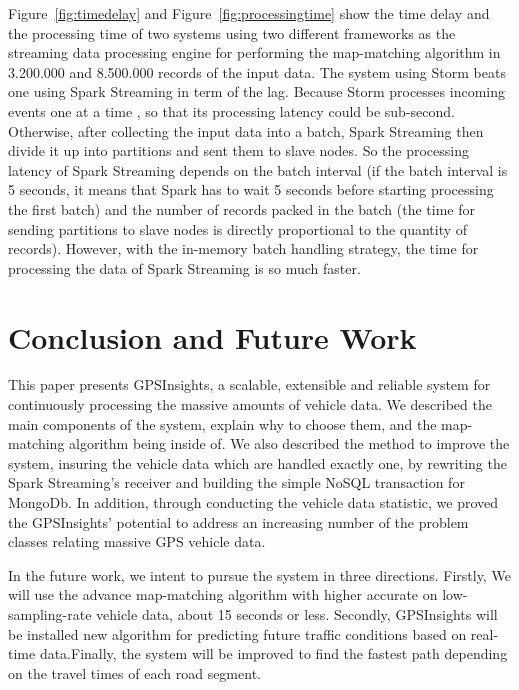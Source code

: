 \documentclass{acm_proc_article-sp}
\begin{document}
Figure~\ref{fig:timedelay} and Figure~\ref{fig:processingtime} show the time delay and the processing time of two systems using two different frameworks as the streaming data processing engine for performing the map-matching algorithm in 3.200.000 and 8.500.000 records of the input data. The system using Storm beats one using Spark Streaming in term of the lag. Because Storm processes incoming events one at a time , so that its processing latency could be sub-second. Otherwise, after collecting the input data into a batch, Spark Streaming then divide it up into partitions and sent them to slave nodes. So the processing latency of Spark Streaming depends on the batch interval (if the batch interval is 5 seconds, it means that Spark has to wait 5 seconds before starting processing the first batch)  and the number of records packed in the batch (the time for sending partitions to slave nodes is directly proportional to the quantity of records). However, with the in-memory batch handling strategy, the time for processing the data of Spark Streaming is so much faster.	
	

			
\section{Conclusion and Future Work}
This paper presents GPSInsights, a scalable, extensible and reliable system for continuously processing the massive amounts of vehicle data. We described the main components of the system, explain why to choose them, and the map-matching algorithm being inside of. We also described the method to improve the system, insuring the vehicle data which are handled exactly one, by rewriting the Spark Streaming's receiver and building the simple NoSQL transaction for MongoDb. In addition, through conducting the vehicle data statistic, we proved the GPSInsights' potential to address an increasing number of the problem classes relating massive GPS vehicle data.

In the future work, we intent to pursue the system in three directions. Firstly, We will use the advance map-matching algorithm with higher accurate on low-sampling-rate vehicle data, about 15 seconds or less. Secondly, GPSInsights will be installed new algorithm for predicting future traffic conditions based on real-time data.Finally, the system will be improved to find the fastest path depending on the travel times of each road segment.
%

%
%
\appendix \label{appendix}
\end{document}
